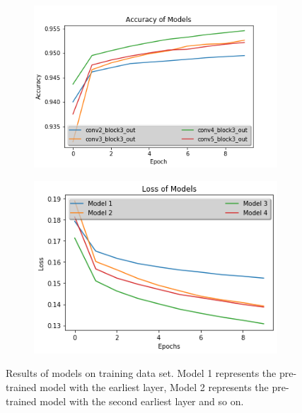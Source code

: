 \documentclass{article}
\begin{document}
\begin{figure}[ht]
    \centering
    \begin{subfigure}[b]{0.8\linewidth}
      \includegraphics[width=\linewidth]{accuray.png}
    \end{subfigure}
    
    \begin{subfigure}[b]{0.8\linewidth}
      \includegraphics[width=\linewidth]{loss.png}
    \end{subfigure}
    \caption{Results of models on training data set. Model 1 represents the pre-trained model with the earliest layer, Model 2 represents the pre-trained model with the second earliest layer and so on.}
  \end{figure}
\end{document}
